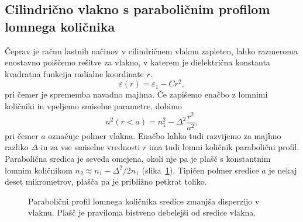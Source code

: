 \subsection*{Cilindrično vlakno s paraboličnim profilom lomnega količnika}
Čeprav je račun lastnih načinov v cilindričnem vlaknu zapleten, lahko 
razmeroma enostavno poiščemo rešitve za vlakno, v katerem je dielektrična 
konstanta kvadratna funkcija radialne koordinate $r$. 
\begin{equation}
\varepsilon (r) = \varepsilon_1 - C r^2,
\end{equation}
pri čemer je sprememba navadno majhna. Če zapišemo enačbo z lomnimi količniki
in vpeljemo smiselne parametre, dobimo
\begin{equation}
n^2\left(r<a\right)=n_{1}^{2}- \Delta^2 \frac{r^2}{a^2},
\label{9.15}
\end{equation}
pri čemer $a$ označuje polmer vlakna.
Enačbo lahko tudi razvijemo za majhno razliko $\Delta$ in za vse smiselne vrednosti $r$
ima tudi lomni količnik parabolični profil. Parabolična
sredica je seveda omejena, okoli nje pa je plašč s konstantnim
lomnim količnikom $n_2 \approx n_1-\Delta^2/2n_1$ (slika~\ref{fig:GRIN}). 
Tipičen polmer sredice $a$ je nekaj deset mikrometrov, plašča pa je približno petkrat toliko.
\begin{figure}[h]
\centering
\def\svgwidth{90truemm} 
 
\caption{Parabolični profil lomnega količnika sredice zmanjša disperzijo v vlaknu. Plašč
 je praviloma bistveno debelejši od sredice vlakna.}
\label{fig:GRIN}
\end{figure}

